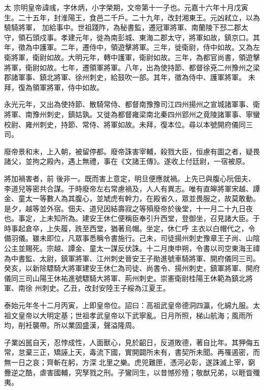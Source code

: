 
\begin{pinyinscope}

 太
 宗明皇帝諱彧，字休炳，小字榮期，文帝第十一子也。元嘉十六年十月戊寅生。二十五年，封淮陽王，食邑二千戶。二十九年，改封湘東王。元凶弒立，以為驍騎將軍，
 加給事中。世祖踐阼，為秘書監，遷冠軍將軍、南蘭陵下邳二郡太守，領石頭戍事。孝建元年，徙為南彭城、東海二郡太守，將軍如故，鎮京口。其年，徵為中護軍。二年，遷侍中，領遊擊將軍。三年，徙衛尉，侍中如故。又為左衛將軍，衛尉如故。大明元年，轉中護軍，衛尉如故。三年，為都官尚書，領遊擊將軍，衛尉如故。七年，遷領軍將軍。八年，出為使持節、都督徐兗二州豫州之梁郡諸軍事、鎮北將軍、徐州刺史，給鼓吹一部。其年，徵為侍中、護軍將軍。
 未拜，復為領軍將軍，侍中如故。



 永光元年，又出為使持節、散騎常侍、都督南豫豫司江四州揚州之宣城諸軍事、衛將軍、南豫州刺史，鎮姑孰。又徙為都督雍梁南北秦四州郢州之竟陵諸軍事、寧蠻校尉、雍州刺史，持節、常侍、將軍如故。未拜，復本位。尋以本號開府儀同三司。



 廢帝景和末，上入朝，被留停都。廢帝誅害宰輔，殺戮大臣，恒慮有圖之者，疑畏諸父，並拘之殿內，遇上無禮，事在《文諸王傳》。遂收上付廷尉，一宿被原。



 將加禍害者，前
 後非一。既而害上意定，明旦便應就禍。上先已與腹心阮佃夫、李道兒等密共合謀。于時廢帝左右常慮禍及，人人有異志。唯有直皞將軍宋越、譚金、童太一等數人為其腹心，並虓虎有幹力，在殿省久，眾並畏服之，故莫敢動。是夕，越等並外宿。佃夫、道兒因結壽寂之等殞廢帝於後堂，十一月二十九日夜也。事定，上未知所為。建安王休仁便稱臣奉引升西堂，登御坐，召見諸大臣。于時事起倉卒，上失履，跣至西堂，猶著烏帽。坐定，休仁呼
 主衣以白帽代之，令備羽儀。雖未即位，凡眾事悉稱令書施行。己未，司徒揚州刺史豫章王子尚、山陰公主並賜死。宗越、譚金、童太一謀反伏誅。十二月庚申朔，令書以司空東海王禕為中書監、太尉，鎮軍將軍、江州刺史晉安王子勛進號車騎將軍、開府儀同三司。癸亥，以新除驃騎大將軍建安王休仁為司徒、尚書令、揚州刺史，鎮軍將軍、開府儀同三司山陽王休祐進號驃騎大將軍、荊州刺史。崇憲衛尉桂陽王休範為鎮北將軍、南徐
 州刺史。乙丑，改封安陸王子綏為江夏王。



 泰始元年冬十二月丙寅，上即皇帝位。詔曰：高祖武皇帝德洞四瀛，化綿九服。太祖文皇帝以大明定基；世祖孝武皇帝以下武寧亂。日月所照，梯山航海；風雨所均，削衽襲帶。所以業固盛漢，聲溢隆周。



 子業凶嚚自天，忍悖成性，人面獸心，見於齠日，反道敗德，著自比年。其狎侮五常，怠棄三正，矯誣上天，毒流下國，實開闢所未有，書契所未聞。再罹遏密，而無一日之哀；齊斬在躬，方深
 北里之樂。虎兕難匣，憑河必彰，遂誅滅上宰，窮釁逆之酷，虐害國輔，究孥戮之刑。子鸞同生，以昔憾殄殪；敬猷兄弟，以睚眥殲夷。




\end{pinyinscope}
